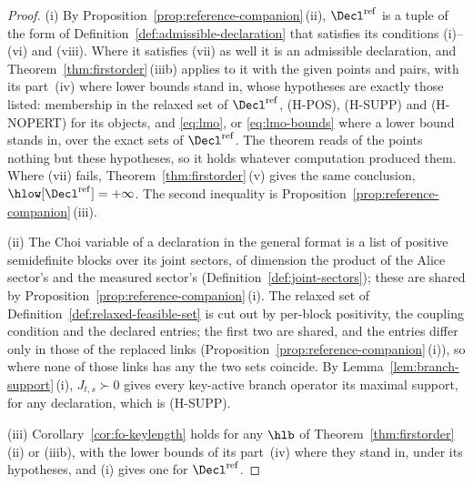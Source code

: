 \begin{proof}
(i) By Proposition~\ref{prop:reference-companion}\,(ii),
$\Decl^{\mathrm{ref}}$ is a tuple of the form of
Definition~\ref{def:admissible-declaration} that satisfies its conditions
(i)--(vi) and (viii). Where it satisfies (vii) as well it is an admissible
declaration, and Theorem~\ref{thm:firstorder}\,(iiib) applies to it with
the given points and pairs, with its part~(iv) where lower bounds stand in,
whose hypotheses are exactly those listed: membership in the relaxed set of
$\Decl^{\mathrm{ref}}$, (H-POS), (H-SUPP) and (H-NOPERT) for its objects,
and \eqref{eq:lmo}, or \eqref{eq:lmo-bounds} where a lower bound stands in,
over the exact sets of $\Decl^{\mathrm{ref}}$. The theorem reads of the
points nothing but these hypotheses, so it holds whatever computation
produced them. Where (vii) fails, Theorem~\ref{thm:firstorder}\,(v)
gives the same conclusion, $\hlow[\Decl^{\mathrm{ref}}]=+\infty$. The second
inequality is Proposition~\ref{prop:reference-companion}\,(iii).

(ii) The Choi variable of a declaration in the general format is a list of
positive semidefinite blocks over its joint sectors, of dimension the
product of the Alice sector's and the measured sector's
(Definition~\ref{def:joint-sectors}); these are shared by
Proposition~\ref{prop:reference-companion}\,(i). The relaxed set of
Definition~\ref{def:relaxed-feasible-set} is cut out by per-block positivity,
the coupling condition and the declared entries; the first two are shared,
and the entries differ only in those of the replaced links
(Proposition~\ref{prop:reference-companion}\,(i)), so where none of those
links has any the two sets coincide. By
Lemma~\ref{lem:branch-support}\,(i), $J_{t,s}\succ0$ gives every
key-active branch operator its maximal support, for any declaration, which
is (H-SUPP).

(iii) Corollary~\ref{cor:fo-keylength} holds for any $\hlb$ of
Theorem~\ref{thm:firstorder}\,(ii) or (iiib), with the lower bounds of its
part~(iv) where they stand in, under its hypotheses, and (i) gives one for
$\Decl^{\mathrm{ref}}$.
\end{proof}
